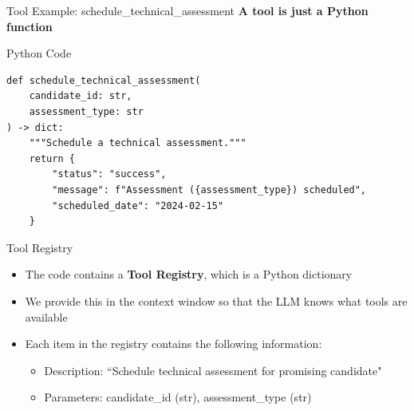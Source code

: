 \documentclass[aspectratio=169]{beamer}
\begin{document}
\begin{frame}[fragile]{Tool Example: schedule\_technical\_assessment}
\textbf{A tool is just a Python function}
\vspace{0.2cm}

\begin{block}{Python Code}
{\small
\begin{verbatim}
def schedule_technical_assessment(
    candidate_id: str,
    assessment_type: str
) -> dict:
    """Schedule a technical assessment."""
    return {
        "status": "success",
        "message": f"Assessment ({assessment_type}) scheduled",
        "scheduled_date": "2024-02-15"
    }
\end{verbatim}
}
\end{block}
\vspace{0.2cm}

\end{frame}

\begin{frame}{Tool Registry}
\begin{itemize}
	\item The code contains a \textbf{Tool Registry}, which is a Python dictionary
	\item We provide this in the context window so that the LLM knows what tools are available
	\item Each item in the registry contains the following information:

\begin{itemize}
    \item Description: ``Schedule technical assessment for promising candidate"
    \item Parameters: candidate\_id (str), assessment\_type (str)
\end{itemize}
\end{itemize}
\end{frame}
\end{document}
